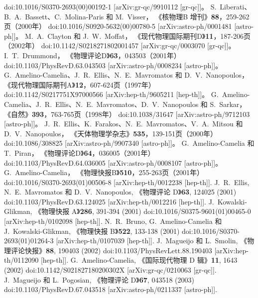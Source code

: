\documentclass[jkps,preprint,fleqn]{revtex4}
\begin{document}
\begin{thebibliography}{999}
doi:10.1016/S0370-2693(00)00192-1
[arXiv:gr-qc/9910112 [gr-qc]]。
S.~Liberati、B.~A.~Bassett、C.~Molina-Paris 和 M.~Visser，
《核物理B 增刊》\textbf{88}，259-262页（2000年）
doi:10.1016/S0920-5632(00)00780-5
[arXiv:astro-ph/0001481 [astro-ph]]。
M.~A.~Clayton 和 J.~W.~Moffat，
《现代物理国际期刊D》\textbf{11}，187-206页（2002年）
doi:10.1142/S0218271802001457
[arXiv:gr-qc/0003070 [gr-qc]]。
I.~T.~Drummond，
《物理评论D》\textbf{63}，043503（2001年）
doi:10.1103/PhysRevD.63.043503
[arXiv:astro-ph/0008234 [astro-ph]]。
G.~Amelino-Camelia、J.~R.~Ellis、N.~E.~Mavromatos 和 D.~V.~Nanopoulos，
《现代物理国际期刊A》\textbf{12}，607-624页（1997年）
doi:10.1142/S0217751X97000566
[arXiv:hep-th/9605211 [hep-th]]。
G.~Amelino-Camelia、J.~R.~Ellis、N.~E.~Mavromatos、D.~V.~Nanopoulos 和 S.~Sarkar，
《自然》\textbf{393}，763-765页（1998年）
doi:10.1038/31647
[arXiv:astro-ph/9712103 [astro-ph]]。
J.~R.~Ellis、K.~Farakos、N.~E.~Mavromatos、V.~A.~Mitsou 和 D.~V.~Nanopoulos，
《天体物理学杂志》\textbf{535}，139-151页（2000年）
doi:10.1086/308825
[arXiv:astro-ph/9907340 [astro-ph]]。
G.~Amelino-Camelia 和 T.~Piran，
《物理评论D》\textbf{64}，036005（2001年）
doi:10.1103/PhysRevD.64.036005
[arXiv:astro-ph/0008107 [astro-ph]]。
G.~Amelino-Camelia，
《物理快报B》\textbf{510}，255-263页（2001年）
doi:10.1016/S0370-2693(01)00506-8
[arXiv:hep-th/0012238 [hep-th]].
J.~R.~Ellis, N.~E.~Mavromatos 和 D.~V.~Nanopoulos,
《物理评论 D》\textbf{63}, 124025 (2001)
doi:10.1103/PhysRevD.63.124025
[arXiv:hep-th/0012216 [hep-th]].
J.~Kowalski-Glikman,
《物理快报 A》\textbf{286}, 391-394 (2001)
doi:10.1016/S0375-9601(01)00465-0
[arXiv:hep-th/0102098 [hep-th]].
N.~R.~Bruno, G.~Amelino-Camelia 和 J.~Kowalski-Glikman,
《物理快报 B》\textbf{522}, 133-138 (2001)
doi:10.1016/S0370-2693(01)01264-3
[arXiv:hep-th/0107039 [hep-th]].
J.~Magueijo 和 L.~Smolin,
《物理评论快报》\textbf{88}, 190403 (2002)
doi:10.1103/PhysRevLett.88.190403
[arXiv:hep-th/0112090 [hep-th]].
G.~Amelino-Camelia,
《国际现代物理 D 辑》\textbf{11}, 1643 (2002)
doi:10.1142/S021827180200302X
[arXiv:gr-qc/0210063 [gr-qc]].
J.~Magueijo 和 L.~Pogosian,
《物理评论 D》\textbf{67}, 043518 (2003)
doi:10.1103/PhysRevD.67.043518
[arXiv:astro-ph/0211337 [astro-ph]].

\end{thebibliography}
\end{document}

